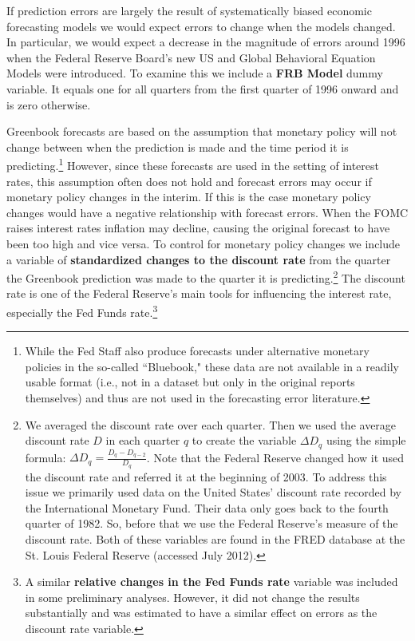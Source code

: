 \documentclass[a4paper]{article}
\begin{document}
If prediction errors are largely the result of systematically biased economic forecasting models we would expect errors to change when the models changed. In particular, we would expect a decrease in the magnitude of errors around 1996 when the Federal Reserve Board's new US and Global Behavioral Equation Models were introduced. To examine this we include a {\bf{FRB Model}} dummy variable. It equals one for all quarters from the first quarter of 1996 onward and is zero otherwise.

Greenbook forecasts are based on the assumption that monetary policy will not change between when the prediction is made and the time period it is predicting.\footnote{While the Fed Staff also produce forecasts under alternative monetary policies in the so-called ``Bluebook," these data are not available in a readily usable format (i.e., not in a dataset but only in the original reports themselves) and thus are not used in the forecasting error literature.} However, since these forecasts are used in the setting of interest rates, this assumption often does not hold and forecast errors may occur if monetary policy changes in the interim. If this is the case monetary policy changes would have a negative relationship with forecast errors. When the FOMC raises interest rates inflation may decline, causing the original forecast to have been too high and vice versa. To control for monetary policy changes we include a variable of {\bf{standardized changes to the discount rate}} from the quarter the Greenbook prediction was made to the quarter it is predicting.\footnote{We averaged the discount rate over each quarter. Then we used the average discount rate $D$ in each quarter $q$ to create the variable $\Delta D_{q}$ using the simple formula: $\Delta D_{q} = \frac{D_{q} - D_{q-2}}{D_{q}}$. Note that the Federal Reserve changed how it used the discount rate and referred it at the beginning of 2003. To address this issue we primarily used data on the United States' discount rate recorded by the International Monetary Fund. Their data only goes back to the fourth quarter of 1982. So, before that we use the Federal Reserve's measure of the discount rate. Both of these variables are found in the FRED database at the St. Louis Federal Reserve (accessed July 2012). } The discount rate is one of the Federal Reserve's main tools for influencing the interest rate, especially the Fed Funds rate.\footnote{A similar {\bf{relative changes in the Fed Funds rate}} variable was included in some preliminary analyses. However, it did not change the results substantially and was estimated to have a similar effect on errors as the discount rate variable.}
\end{document}
